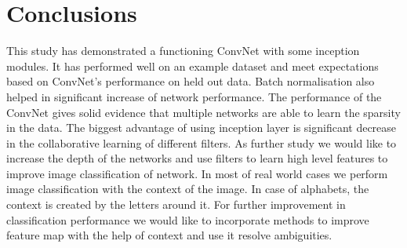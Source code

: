 \documentclass[fleqn,10pt]{SelfArx} %
\begin{document}
\section{Conclusions}
This study has demonstrated a functioning ConvNet with some inception modules. It has performed well on an example dataset and meet expectations based on ConvNet's performance on held out data. Batch normalisation also helped in significant increase of network performance.  
\newline
The performance of the ConvNet gives solid evidence that multiple networks are able to learn the sparsity in the data. The biggest advantage of using inception layer is significant decrease in the collaborative learning of different filters. As further study we would like to increase the depth of the networks and use filters to learn high level features to improve image classification of network.
\newline
In most of real world cases we perform image classification with the context of the image. In case of alphabets, the context is created by the letters around it. For further improvement in classification performance we would like to incorporate methods to improve feature map with the help of context and use it resolve ambiguities.
\end{document}
